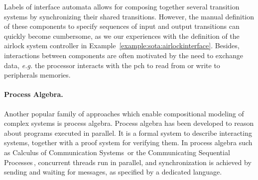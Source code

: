 Labels of interface automata allows for composing together several transition
systems by synchronizing their shared transitions.
%
However, the manual definition of these components to specify sequences of input
and output transitions can quickly become cumbersome, as we our experiences with
the definition of the airlock system controller in
Example~\ref{example:sota:airlockinterface}.
%
Besides, interactions between components are often motivated by the need to
exchange data, \emph{e.g.} the processor interacts with the \ac{pch} to read
from or write to peripherals memories.

\paragraph{Process Algebra.}
%
Another popular family of approaches which enable compositional modeling of
complex systems is process algebra.
%
Process algebra has been developed to reason about programs executed in
parallel.
%
It is a formal system to describe interacting systems, together with a proof
system for verifying them.
%
In process algebra such as Calculus of Communication
Systems\,\cite{milner1980ccs} or the Communicating Sequential
Processes\,\cite{hoare1978csp}, concurrent threads run in parallel, and
synchronization is achieved by sending and waiting for messages, as specified by
a dedicated language.

